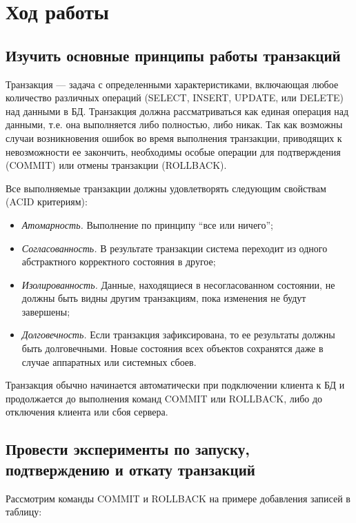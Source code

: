 \section{Ход работы}

\subsection{Изучить основные принципы работы транзакций}

Транзакция --- задача с определенными характеристиками, включающая любое количество различных операций (SELECT, INSERT, UPDATE, или DELETE) над данными в БД. Транзакция должна рассматриваться как единая операция над данными, т.е. она выполняется либо полностью, либо никак. Так как возможны случаи возникновения ошибок во время выполнения транзакции, приводящих к невозможности ее закончить, необходимы особые операции для подтверждения (COMMIT) или отмены транзакции (ROLLBACK).

Все выполняемые транзакции должны удовлетворять следующим свойствам (ACID критериям): 

\begin{itemize}
 	\item \emph{Атомарность.} Выполнение по принципу "`все или ничего"';
 	\item \emph{Согласованность.} В результате транзакции система переходит из одного абстрактного корректного состояния в другое;
 	\item \emph{Изолированность.} Данные, находящиеся в несогласованном состоянии, не должны быть видны другим транзакциям, пока изменения не будут завершены;
 	\item \emph{Долговечность.} Если транзакция зафиксирована, то ее результаты должны быть долговечными. Новые состояния всех объектов сохранятся даже в случае аппаратных или системных сбоев.  
 \end{itemize}  

Транзакция обычно начинается автоматически при подключении клиента к БД и продолжается до выполнения команд COMMIT или ROLLBACK, либо до отключения клиента или сбоя сервера.

\subsection{Провести эксперименты по запуску, подтверждению и откату транзакций}

Рассмотрим команды COMMIT и ROLLBACK на примере добавления записей в таблицу: 

